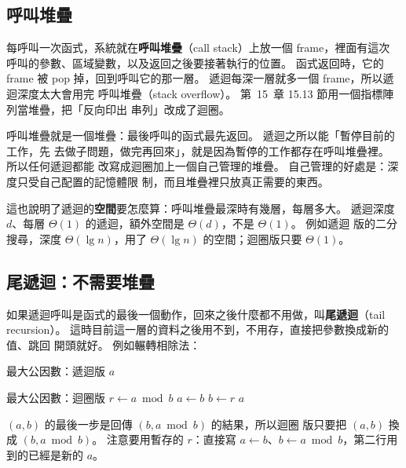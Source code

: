 \subsection{呼叫堆疊}

\begin{cbookrecap}[第~15~章 15.4 節、15.13 節]
每呼叫一次函式，系統就在\textbf{呼叫堆疊}（call stack）上放一個 frame，裡面有這次
呼叫的參數、區域變數，以及返回之後要接著執行的位置。 函式返回時，它的 frame 被
pop 掉，回到呼叫它的那一層。 遞迴每深一層就多一個 frame，所以遞迴深度太大會用完
呼叫堆疊（stack overflow）。 第~15~章 15.13 節用一個指標陣列當堆疊，把「反向印出
串列」改成了迴圈。
\end{cbookrecap}

呼叫堆疊就是一個堆疊：最後呼叫的函式最先返回。 遞迴之所以能「暫停目前的工作，先
去做子問題，做完再回來」，就是因為暫停的工作都存在呼叫堆疊裡。 所以任何遞迴都能
改寫成迴圈加上一個自己管理的堆疊。 自己管理的好處是：深度只受自己配置的記憶體限
制，而且堆疊裡只放真正需要的東西。

這也說明了遞迴的\textbf{空間}要怎麼算：呼叫堆疊最深時有幾層，每層多大。 遞迴深度
$d$、每層 $\Theta(1)$ 的遞迴，額外空間是 $\Theta(d)$，不是 $\Theta(1)$。 例如遞迴
版的二分搜尋，深度 $\Theta(\lg n)$，用了 $\Theta(\lg n)$ 的空間；迴圈版只要
$\Theta(1)$。

\subsection{尾遞迴：不需要堆疊}

如果遞迴呼叫是函式的最後一個動作，回來之後什麼都不用做，叫\textbf{尾遞迴}（tail
recursion）。 這時目前這一層的資料之後用不到，不用存，直接把參數換成新的值、跳回
開頭就好。 例如輾轉相除法：

\begin{pseudo}[label=alg:sq-gcd, unbreakable]{最大公因數：遞迴版}
        \State \Return $a$
    \EndIf
    \State \Return {}
\EndFunction
\end{pseudo}

\begin{pseudo}[label=alg:sq-gcd-iter, unbreakable]{最大公因數：迴圈版}
        \State $r \gets a \bmod b$
        \State $a \gets b$
        \State $b \gets r$
    \EndWhile
    \State \Return $a$
\EndFunction
\end{pseudo}

$(a, b)$ 的最後一步是回傳 $(b, a \bmod b)$ 的結果，所以迴圈
版只要把 $(a, b)$ 換成 $(b, a \bmod b)$。 注意要用暫存的 $r$：直接寫
$a \gets b$、$b \gets a \bmod b$，第二行用到的已經是新的 $a$。

